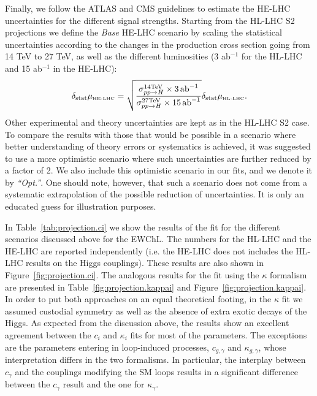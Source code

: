 %
Finally, we follow the ATLAS and CMS guidelines to estimate the HE-LHC uncertainties for the different signal strengths.  
Starting from the HL-LHC S2 projections we define the {\it Base} HE-LHC scenario by scaling the statistical uncertainties according to the changes in the production cross section going from 14 TeV to 27 TeV, as well as the different luminosities (3 ab$^{-1}$ for the HL-LHC and 15 ab$^{-1}$ in the HE-LHC):
%
\begin{equation}
\delta_{\mathrm{stat}} \mu_{\mbox{\tiny HE-LHC}} = \sqrt{\frac{\sigma_{pp\to H}^{\mathrm{14 TeV}}\times 3~\!\mathrm{ab}^{-1}}{\sigma_{pp\to H}^{\mathrm{27 TeV}}\times 15~\! \mathrm{ab}^{-1}}} \delta_{\mathrm{stat}} \mu_{\mbox{\tiny HL-LHC}} .
\end{equation}
%
Other experimental and theory uncertainties are kept as in the HL-LHC S2 case. 
To compare the results with those that would be possible in a scenario where better understanding of theory errors or systematics is achieved, it was suggested to use a more optimistic scenario where such uncertainties are further reduced by a factor of 2. We also include this optimistic scenario in our fits, and we denote it by {\it ``Opt.''}. One should note, however, that such a scenario does not come from a systematic extrapolation of the possible reduction of uncertainties. It is only an educated guess for illustration purposes.
\vspace{1cm}
 

In Table~\ref{tab:projection.ci} we show the results of the fit for the different scenarios discussed above for the EWChL. The numbers for the HL-LHC and the HE-LHC are reported independently (i.e. the HE-LHC does not includes the HL-LHC results on the Higgs couplings). %
These results are also shown in Figure~\ref{fig:projection.ci}. 
The analogous results for the fit using the $\kappa$ formalism are presented in Table~\ref{fig:projection.kappai} and Figure~\ref{fig:projection.kappai}. In order to put both approaches on an equal theoretical footing, in the $\kappa$ fit we assumed custodial symmetry as well as the absence of extra exotic decays of the Higgs.  As expected from the discussion above, the results show an excellent agreement between the $c_i$ and $\kappa_i$ fits for most of the parameters. The exceptions are the parameters entering in loop-induced processes, $c_{g,\gamma}$ and $\kappa_{g,\gamma}$, whose interpretation differs in the two formalisms. In particular, the interplay between $c_{\gamma}$ and the couplings modifying the SM loops results in a significant difference between the $c_\gamma$ result and the one for $\kappa_\gamma$.

